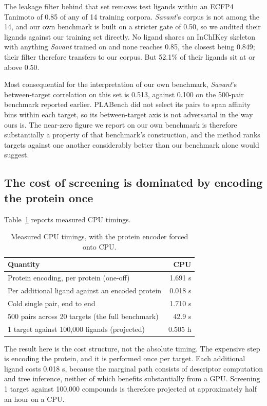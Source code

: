 \documentclass[times, twoside]{zHenriquesLab-StyleBioRxiv}
\newcommand{\savant}{\textit{Savant}\xspace}
\begin{document}
The leakage filter behind that set removes test ligands within an ECFP4 Tanimoto of 0.85 of any of 14 training corpora. \savant's corpus is not among the 14, and our own benchmark is built on a stricter gate of 0.50, so we audited their ligands against our training set directly. No ligand shares an InChIKey skeleton with anything \savant trained on and none reaches 0.85, the closest being 0.849; their filter therefore transfers to our corpus. But 52.1\% of their ligands sit at or above 0.50.

Most consequential for the interpretation of our own benchmark, \savant's between-target correlation on this set is 0.513, against 0.100 on the 500-pair benchmark reported earlier. PLABench did not select its pairs to span affinity bins within each target, so its between-target axis is not adversarial in the way ours is. The near-zero figure we report on our own benchmark is therefore substantially a property of that benchmark's construction, and the method ranks targets against one another considerably better than our benchmark alone would suggest.

\subsection*{The cost of screening is dominated by encoding the protein once}

Table~\ref{tab:runtime} reports measured CPU timings.

\begin{table}[h]
\centering
\caption{Measured CPU timings, with the protein encoder forced onto CPU.}
\label{tab:runtime}
\small
\begin{tabular}{lr}
\toprule
Quantity & CPU \\
\midrule
Protein encoding, per protein (one-off)            & 1.691 s \\
Per additional ligand against an encoded protein   & 0.018 s \\
Cold single pair, end to end                       & 1.710 s \\
500 pairs across 20 targets (the full benchmark)   & 42.9 s \\
1 target against 100,000 ligands (projected)       & 0.505 h \\
\bottomrule
\end{tabular}
\end{table}

The result here is the cost structure, not the absolute timing. The expensive step is encoding the protein, and it is performed once per target. Each additional ligand costs 0.018 s, because the marginal path consists of descriptor computation and tree inference, neither of which benefits substantially from a GPU. Screening 1 target against 100,000 compounds is therefore projected at approximately half an hour on a CPU.
\end{document}

